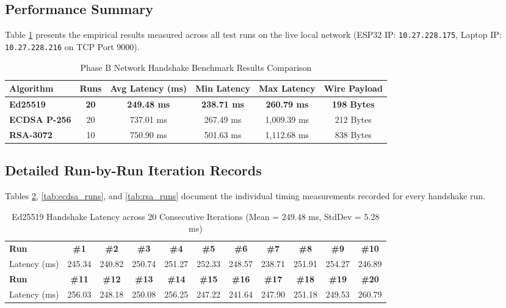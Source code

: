 \documentclass[11pt,a4paper]{article}
\begin{document}
\subsection{Performance Summary}

Table \ref{tab:comparison_summary} presents the empirical results measured across all test runs on the live local network (ESP32 IP: \texttt{10.27.228.175}, Laptop IP: \texttt{10.27.228.216} on TCP Port 9000).

\begin{table}[htbp]
\centering
\caption{Phase B Network Handshake Benchmark Results Comparison}
\label{tab:comparison_summary}
\begin{tabular}{l c c c c c}
\toprule
\textbf{Algorithm} & \textbf{Runs} & \textbf{Avg Latency (ms)} & \textbf{Min Latency} & \textbf{Max Latency} & \textbf{Wire Payload} \\
\midrule
\textbf{Ed25519}     & \textbf{20} & \textbf{249.48 ms} & \textbf{238.71 ms} & \textbf{260.79 ms} & \textbf{198 Bytes} \\
\textbf{ECDSA P-256} & 20          & 737.01 ms          & 267.49 ms          & 1,009.39 ms        & 212 Bytes \\
\textbf{RSA-3072}    & 10          & 750.90 ms          & 501.63 ms          & 1,112.68 ms        & 838 Bytes \\
\bottomrule
\end{tabular}
\end{table}

\subsection{Detailed Run-by-Run Iteration Records}

Tables \ref{tab:ed25519_runs}, \ref{tab:ecdsa_runs}, and \ref{tab:rsa_runs} document the individual timing measurements recorded for every handshake run.

\begin{table}[htbp]
\centering
\footnotesize
\caption{Ed25519 Handshake Latency across 20 Consecutive Iterations (Mean = 249.48 ms, StdDev = 5.28 ms)}
\label{tab:ed25519_runs}
\begin{tabular}{lcccccccccc}
\toprule
\textbf{Run} & \textbf{\#1} & \textbf{\#2} & \textbf{\#3} & \textbf{\#4} & \textbf{\#5} & \textbf{\#6} & \textbf{\#7} & \textbf{\#8} & \textbf{\#9} & \textbf{\#10} \\
Latency (ms) & 245.34 & 240.82 & 250.74 & 251.27 & 252.33 & 248.57 & 238.71 & 251.91 & 254.27 & 246.89 \\
\midrule
\textbf{Run} & \textbf{\#11} & \textbf{\#12} & \textbf{\#13} & \textbf{\#14} & \textbf{\#15} & \textbf{\#16} & \textbf{\#17} & \textbf{\#18} & \textbf{\#19} & \textbf{\#20} \\
Latency (ms) & 256.03 & 248.18 & 250.08 & 256.25 & 247.22 & 241.64 & 247.90 & 251.18 & 249.53 & 260.79 \\
\bottomrule
\end{tabular}
\end{table}
\end{document}
